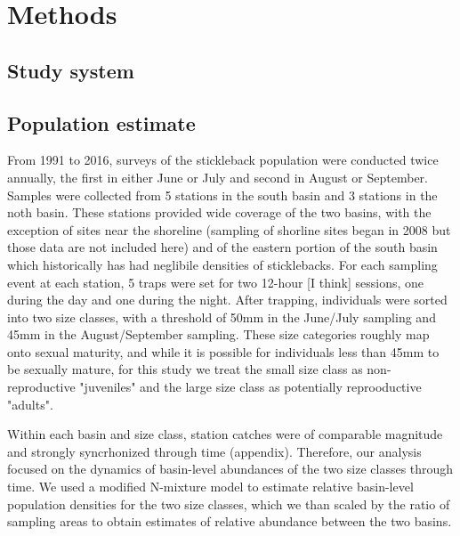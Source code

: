 

\section*{Methods}


\subsection*{Study system}


\subsection*{Population estimate}

From 1991 to 2016, surveys of the stickleback population were conducted twice annually, 
the first in either June or July and second in August or September. 
Samples were collected from 5 stations in the south basin and 3 stations in the noth basin.
These stations provided wide coverage of the two basins, 
with the exception of sites near the shoreline 
(sampling of shorline sites began in 2008 but those data are not included here)
and of the eastern portion of the south basin which historically has had neglibile 
densities of sticklebacks.
For each sampling event at each station, 
5 traps were set for two 12-hour [I think] sessions, 
one during the day and one during the night.
After trapping, individuals were sorted into two size classes,
with a threshold of 50mm in the June/July sampling and 45mm in the August/September sampling.
These size categories roughly map onto sexual maturity,
and while it is possible for individuals less than 45mm to be sexually mature,
for this study we treat the small size class as non-reproductive "juveniles"
and the large size class as potentially reprooductive "adults".

Within each basin and size class, 
station catches were of comparable magnitude and 
strongly syncrhonized through time (appendix).
Therefore, our analysis focused on the dynamics of basin-level abundances
of the two size classes through time.
We used a modified N-mixture model to estimate relative basin-level population densities
for the two size classes,
which we than scaled by the ratio of sampling areas to obtain estimates of relative
abundance between the two basins.

